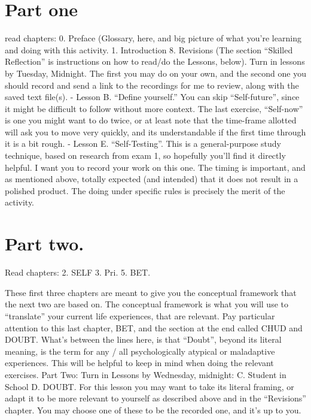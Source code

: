 \documentclass[
]{book}
\begin{document}
\section{Part one}\label{part-one}

read chapters:
0. Preface (Glossary, here, and big picture of what you're learning and doing with this activity.
1. Introduction
8. Revisions (The section ``Skilled Reflection'' is instructions on how to read/do the Lessons, below).
Turn in lessons by Tuesday, Midnight. The first you may do on your own, and the second one you should record and send a link to the recordings for me to review, along with the saved text file(s).
- Lesson B. ``Define yourself.'' You can skip ``Self-future'', since it might be difficult to follow without more context. The last exercise, ``Self-now'' is one you might want to do twice, or at least note that the time-frame allotted will ask you to move very quickly, and its understandable if the first time through it is a bit rough.
- Lesson E. ``Self-Testing''. This is a general-purpose study technique, based on research from exam 1, so hopefully you'll find it directly helpful. I want you to record your work on this one. The timing is important, and as mentioned above, totally expected (and intended) that it does not result in a polished product. The doing under specific rules is precisely the merit of the activity.

\section{Part two.}\label{part-two.}

Read chapters:
2. SELF
3. Pri.
5. BET.

These first three chapters are meant to give you the conceptual framework that the next two are based on. The conceptual framework is what you will use to ``translate'' your current life experiences, that are relevant. Pay particular attention to this last chapter, BET, and the section at the end called CHUD and DOUBT. What's between the lines here, is that ``Doubt'', beyond its literal meaning, is the term for any / all psychologically atypical or maladaptive experiences. This will be helpful to keep in mind when doing the relevant exercises.
Part Two: Turn in Lessons by Wednesday, midnight:
C. Student in School
D. DOUBT. For this lesson you may want to take its literal framing, or adapt it to be more relevant to yourself as described above and in the ``Revisions'' chapter.
You may choose one of these to be the recorded one, and it's up to you.
\end{document}
